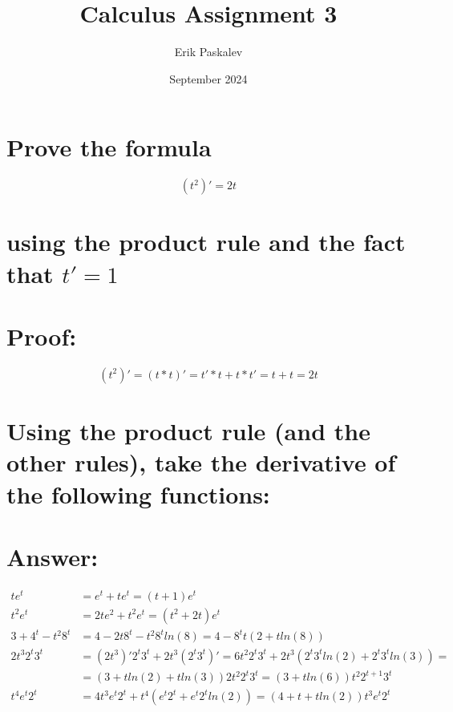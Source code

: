 \documentclass{article}
\title{Calculus Assignment 3}
\author{Erik Paskalev}
\date{September 2024}
\begin{document}
\maketitle

\section{\normalfont Prove the formula}

\begin{equation}
(t^2)' = 2t
\end{equation}

\section*{\normalfont using the product rule and the fact that $t' = 1$}

\section*{Proof:}

\begin{equation}
(t^2)' = (t*t)' = t'*t + t*t' = t + t = 2t
\end{equation}

\section{\normalfont Using the product rule (and the other rules), take the derivative of the following functions:}

\section*{Answer:}

\begin{equation}
\begin{split}
te^t & = e^t + te^t = (t+1)e^t \\
t^2e^t & = 2te^2 + t^2e^t = (t^2 + 2t)e^t \\
3 + 4^t - t^2 8^t & = 4 - 2t8^t - t^2 8^t ln(8) = 4 - 8^t t(2 + tln(8))\\
2t^3 2^t 3^t & = (2t^3)' 2^t 3^t + 2t^3(2^t 3^t)' = 6t^2 2^t 3^t + 2t^3(2^t 3^t ln(2) + 2^t 3^t ln(3)) = \\ 
& = (3 + tln(2) + tln(3))2t^2 2^t 3^t = (3 + tln(6))t^2 2^{t+1} 3^t \\
t^4 e^t 2^t & = 4t^3 e^t 2^t + t^4(e^t 2^t + e^t 2^t ln(2)) = (4 + t + tln(2))t^3 e^t 2^t
\end{split}
\end{equation}
\end{document}
